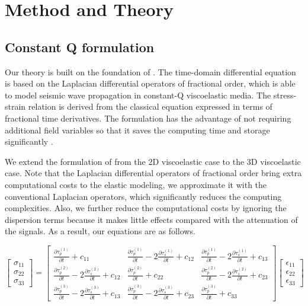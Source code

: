 \documentclass{paris17}
\begin{document}
\section{Method and Theory}

\subsection{Constant Q formulation}

Our theory is built on the foundation of \cite{zhu2014theory}. The time-domain differential equation is based on the Laplacian differential operators of fractional order, which is able to model seismic wave propagation in constant-Q viscoelastic media. The stress-strain relation is derived from the classical equation expressed in terms of fractional time derivatives. The formulation has the advantage of not requiring additional field variables so that it saves the computing time and storage significantly \cite[]{zhu2014theory}.

We extend the formulation of \cite{zhu2014theory} from the 2D viscoelastic case to the 3D viscoelastic case. Note that the Laplacian differential operators of fractional order bring extra computational costs to the elastic modeling, we approximate it with the conventional Laplacian operators, which significantly reduces the computing complexities. Also, we further reduce the computational costs by ignoring the dispersion terms because it makes little effects compared with the attenuation of the signals. As a result, our equations are as follows.

\begin{equation}
\begin{bmatrix} \sigma_{11}\\ \sigma_{22}\\ \sigma_{33} \end{bmatrix} = \begin{bmatrix} \frac{\partial \tau_p^{(1)}}{\partial t} + c_{11} & \frac{\partial \tau_p^{(1)}}{\partial t} - 2\frac{\partial \tau_s^{(1)}}{\partial t} +c_{12}& \frac{\partial \tau_p^{(1)}}{\partial t} - 2\frac{\partial \tau_s^{(1)}}{\partial t} +c_{13} \\ \frac{\partial \tau_p^{(2)}}{\partial t} - 2\frac{\partial \tau_s^{(2)}}{\partial t} +c_{12}& \frac{\partial \tau_p^{(2)}}{\partial t} + c_{22} & \frac{\partial \tau_p^{(2)}}{\partial t} - 2\frac{\partial \tau_s^{(2)}}{\partial t} +c_{23}\\ \frac{\partial \tau_p^{(3)}}{\partial t} - 2\frac{\partial \tau_s^{(3)}}{\partial t} +c_{13} & \frac{\partial \tau_p^{(3)}}{\partial t} - 2\frac{\partial \tau_s^{(3)}}{\partial t} +c_{23} & \frac{\partial \tau_p^{(3)}}{\partial t} + c_{33} \end{bmatrix} \begin{bmatrix} \epsilon_{11}\\ \epsilon_{22}\\ \epsilon_{33} \end{bmatrix}
\end{equation}
\end{document}
